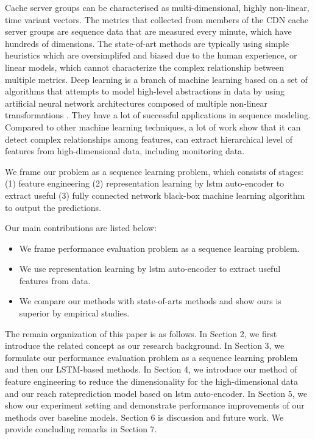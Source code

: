 \documentclass[5p]{elsarticle}
\newcommand{\dabiaolv}{reach rate}
\begin{document}
Cache server groups can be characterised as multi-dimensional, highly non-linear, time variant vectors. The metrics that collected from members of the CDN cache server groups are sequence data that are measured every minute, which have hundreds of dimensions. The state-of-art methods are typically using simple heuristics  which are oversimplifed and biased due to the human experience, or linear models, which cannot characterize the complex relationship between multiple metrics. Deep learning is a branch of machine learning based on a set of algorithms that attempts to model high-level abstractions in data by using artificial neural network architectures composed of multiple non-linear transformations \cite{Lecun2015}. They have a lot of successful applications in sequence modeling. Compared to other machine learning techniques, a lot of work show that it can detect complex relationships among features, can extract hierarchical level of features from high-dimensional data, including monitoring data.

We frame our problem as a sequence learning problem, which consists of stages: (1) feature engineering (2) representation learning by lstm auto-encoder to extract useful (3) fully connected network black-box machine learning algorithm to output the predictions. 

Our main contributions are listed below:
\begin{itemize}
  \item We frame performance evaluation problem as a sequence learning problem.
  \item We use representation learning by lstm auto-encoder to extract useful features from data.
  \item We compare our methods with state-of-arts methods and show ours is superior by empirical studies.
\end{itemize}

The remain organization of this paper is as follows. In Section 2, we first introduce the related concept as our research background. In Section 3, we formulate our performance evaluation problem as a sequence learning problem and then our LSTM-based methods. In Section 4, we introduce our method of feature engineering to reduce the dimensionality for the high-dimensional data and  our \dabiaolv prediction model based on lstm auto-encoder. In Section 5, we show our experiment setting and demonstrate performance improvements of our methods over baseline models. Section 6 is discussion and future work. We provide concluding remarks in Section 7.
\end{document}
